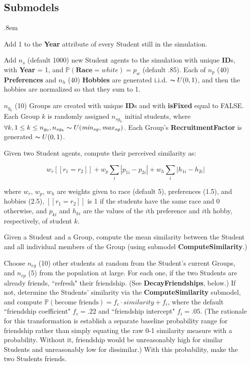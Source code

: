 \subsection{Submodels}

\begin{description}
\itemsep.8em
\item[IncrementYears] Add 1 to the \textbf{Year} attribute of every Student
still in the simulation.

\item[AddNewStudents] Add $n_s$ (default 1000) new Student agents to the
simulation with unique \textbf{ID}s, with \textbf{Year} = 1, and
$\mathbb{P}(\textbf{Race}=white) = p_w$ (default .85). Each of $n_p$ (40)
\textbf{Preferences} and $n_h$ (40) \textbf{Hobbies} are generated i.i.d.
$\thicksim U(0,1)$, and then the hobbies are normalized so that they sum to 1.

\item[AddNewGroups] $n_{g_0}$ (10) Groups are created with unique \textbf{ID}s
and with \textbf{isFixed} equal to FALSE. Each Group $k$ is randomly assigned
$n_{sg_k}$ initial students, where $\forall k, 1\leq k\leq n_{g_0}, n_{sg_k}
\thicksim U(\text{\textit{min}}_{sg},\text{\textit{max}}_{sg})$. Each Group's
\textbf{RecruitmentFactor} is generated $\thicksim U(0,1)$.

\item[ComputeSimilarity] Given two Student agents, compute their perceived
similarity as:

\[
w_r [\![r_1=r_2]\!] +
w_p \sum_i |p_{1i}-p_{2i}| + 
w_h \sum_i |h_{1i}-h_{2i}|
\]

where $w_r$, $w_p$, $w_h$ are weights given to race (default 5), preferences
(1.5), and hobbies (2.5), $[\![r_1=r_2]\!]$ is 1 if the students have the same
race and 0 otherwise, and $p_{ki}$ and $h_{ki}$ are the values of the $i$th
preference and $i$th hobby, respectively, of student $k$.

\item[ComputeAffinity] Given a Student and a Group, compute the mean
similarity between the Student and all individual members of the Group (using
submodel \textbf{ComputeSimilarity}.)

\item[EncounterOthers] Choose $n_{eg}$ (10) other students at random from the
Student's current Groups, and $n_{ep}$ (5) from the population at large. For
each one, if the two Students are already friends, ``refresh" their
friendship. (See \textbf{DecayFriendships}, below.) If not, determine the
Students' similarity via the \textbf{ComputeSimilarity} submodel, and compute
$\mathbb{P}(\text{become friends})=f_c \cdot \textit{similarity} + f_i$, where
the default ``friendship coefficient" $f_c=.22$ and ``friendship intercept"
$f_i=.05$. (The rationale for this transformation is establish a separate
baseline probability range for friendship rather than simply equating the raw
0-1 similarity measure with a probability. Without it, friendship would be
unreasonably high for similar Students and unreasonably low for dissimilar.)
With this probability, make the two Students friends.


\end{description}
